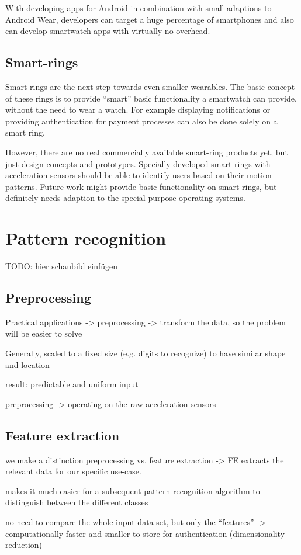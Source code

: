 With developing \glspl{app} for Android in combination with small adaptions to Android Wear, developers can target a huge percentage of smartphones and also can develop smartwatch apps with virtually no overhead.

\subsection{Smart-rings}
Smart-rings are the next step towards even smaller wearables. The basic concept of these rings is to provide ``smart'' basic functionality a smartwatch can provide, without the need to wear a watch. For example displaying notifications or providing authentication for payment processes can also be done solely on a smart ring.

However, there are no real commercially available smart-ring products yet, but just design concepts and prototypes. Specially developed smart-rings with acceleration sensors should be able to identify users based on their motion patterns. Future work might provide basic functionality on smart-rings, but definitely needs adaption to the special purpose operating systems. 

\section{Pattern recognition}
TODO: hier schaubild einfügen
\cite{bishop2006pattern}
\subsection{Preprocessing}
Practical applications -> preprocessing -> transform the data, so the problem will be easier to solve

Generally, scaled to a fixed size (e.g. digits to recognize) to have similar shape and location

result: predictable and uniform input

preprocessing -> operating on the raw acceleration sensors
\subsection{Feature extraction}
we make a distinction preprocessing vs. feature extraction -> FE extracts the relevant data for our specific use-case.

makes it much easier for a subsequent pattern recognition algorithm to distinguish between the different classes

no need to compare the whole input data set, but only the ``features'' -> computationally faster and smaller to store for authentication (dimensionality reduction)

